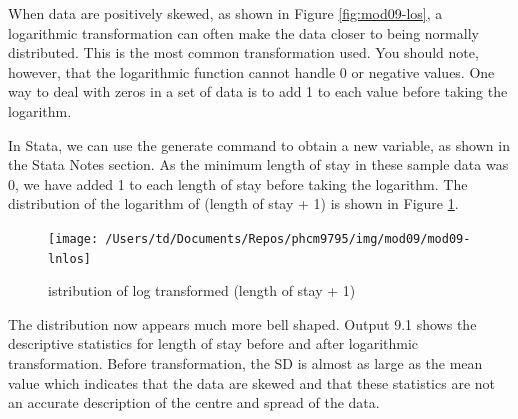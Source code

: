 \documentclass[
]{memoir}
\begin{document}
When data are positively skewed, as shown in Figure \ref{fig:mod09-los}, a logarithmic transformation can often make the data closer to being normally distributed. This is the most common transformation used. You should note, however, that the logarithmic function cannot handle 0 or negative values. One way to deal with zeros in a set of data is to add 1 to each value before taking the logarithm.

In Stata, we can use the generate command to obtain a new variable, as shown in the Stata Notes section. As the minimum length of stay in these sample data was 0, we have added 1 to each length of stay before taking the logarithm. The distribution of the logarithm of (length of stay + 1) is shown in Figure \ref{fig:mod09-lnlos}.

\begin{figure}
\texttt{[image: /Users/td/Documents/Repos/phcm9795/img/mod09/mod09-lnlos]} \caption{istribution of log transformed (length of stay + 1)}\label{fig:mod09-lnlos}
\end{figure}

The distribution now appears much more bell shaped. Output 9.1 shows the descriptive statistics for length of stay before and after logarithmic transformation. Before transformation, the SD is almost as large as the mean value which indicates that the data are skewed and that these statistics are not an accurate description of the centre and spread of the data.
\end{document}
